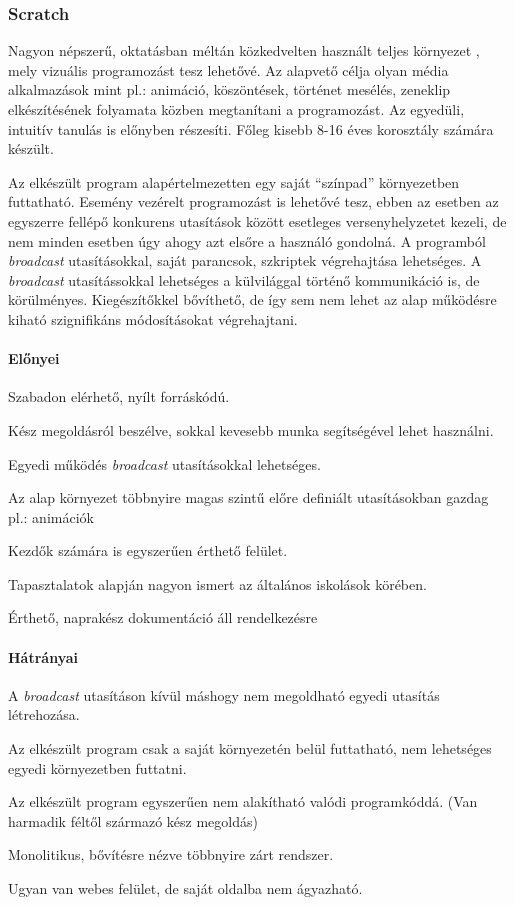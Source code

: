 \documentclass[12pt,a4paper,oneside]{report} %
\begin{document}
\subsubsection{Scratch} 
\label{scratch}
Nagyon népszerű, oktatásban méltán közkedvelten használt teljes környezet \cite{maloney2010scratch, resnick2009scratch, ScratchUrl2019Jan}, mely vizuális programozást tesz lehetővé. Az alapvető célja olyan média alkalmazások mint pl.: animáció, köszöntések, történet mesélés, zeneklip elkészítésének folyamata közben megtanítani a programozást. Az egyedüli, intuitív tanulás is előnyben részesíti. Főleg kisebb 8-16 éves korosztály számára készült. 
\par Az elkészült program alapértelmezetten egy saját ``{színpad}'' környezetben futtatható. Esemény vezérelt programozást is lehetővé tesz, ebben az esetben az egyszerre fellépő konkurens utasítások között esetleges versenyhelyzetet kezeli, de nem minden esetben úgy ahogy azt elsőre a használó gondolná.  A programból \textit{broadcast} utasításokkal, saját parancsok, szkriptek végrehajtása lehetséges. A \textit{broadcast} utasítássokkal lehetséges a külvilággal történő kommunikáció is, de körülményes. Kiegészítőkkel bővíthető, de így sem nem lehet az alap működésre kiható szignifikáns módosításokat végrehajtani.
\paragraph{Előnyei} 
\begin{compactitem}
	\item Szabadon elérhető, nyílt forráskódú.
	\item Kész megoldásról beszélve, sokkal kevesebb munka segítségével lehet használni.
	\item Egyedi működés \textit{broadcast} utasításokkal lehetséges.
	\item Az alap környezet többnyire magas szintű előre definiált utasításokban gazdag pl.: animációk
	\item Kezdők számára is egyszerűen érthető felület.
	\item Tapasztalatok alapján nagyon ismert az általános iskolások körében.
	\item Érthető, naprakész dokumentáció áll rendelkezésre
\end{compactitem}
\paragraph{Hátrányai} 
\begin{compactitem}
	\item A \textit{broadcast} utasításon kívül máshogy nem megoldható egyedi utasítás létrehozása.
	\item Az elkészült program csak a saját környezetén belül futtatható, nem lehetséges egyedi környezetben futtatni.
	\item Az elkészült program egyszerűen nem alakítható valódi programkóddá. (Van harmadik féltől származó kész megoldás)
	\item Monolitikus, bővítésre nézve többnyire zárt rendszer.
	\item Ugyan van webes felület, de saját oldalba nem ágyazható.
\end{compactitem}
\end{document}
